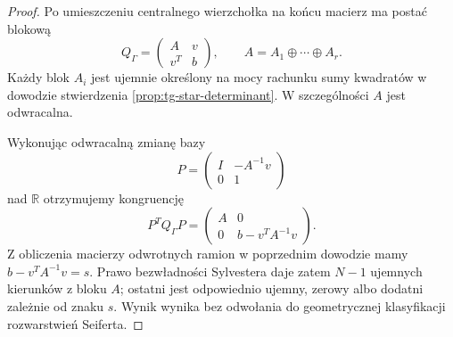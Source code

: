 \begin{proof}
Po umieszczeniu centralnego wierzchołka
na końcu macierz ma postać blokową
\[
Q_\Gamma=\begin{pmatrix}
A&v\\v^T&b
\end{pmatrix},\qquad
A=A_1\oplus\cdots\oplus A_r.
\]
Każdy blok $A_i$ jest ujemnie określony
na mocy rachunku sumy kwadratów w dowodzie
stwierdzenia \ref{prop:tg-star-determinant}.
W szczególności $A$ jest odwracalna.

Wykonując odwracalną zmianę bazy
\[
P=\begin{pmatrix}
I&-A^{-1}v\\0&1
\end{pmatrix}
\]
nad $\mathbb R$ otrzymujemy kongruencję
\[
P^TQ_\Gamma P
=\begin{pmatrix}
A&0\\0&b-v^TA^{-1}v
\end{pmatrix}.
\]
Z obliczenia macierzy odwrotnych ramion
w poprzednim dowodzie mamy
$b-v^TA^{-1}v=s$.
Prawo bezwładności Sylvestera daje zatem
$N-1$ ujemnych kierunków z bloku $A$;
ostatni jest odpowiednio ujemny,
zerowy albo dodatni zależnie od znaku $s$.
Wynik wynika bez odwołania do geometrycznej
klasyfikacji rozwarstwień Seiferta.
\end{proof}

